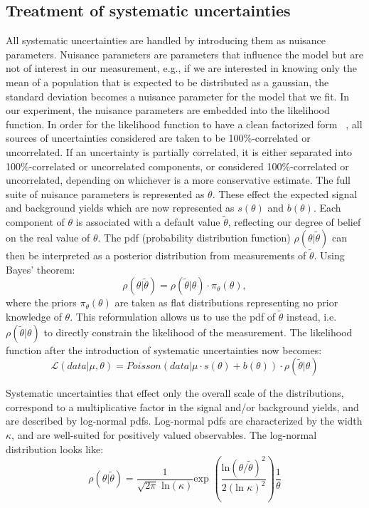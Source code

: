 \subsection{Treatment of systematic uncertainties}
\label{sys_treat}
All systematic uncertainties are handled by introducing them as nuisance parameters. Nuisance parameters are parameters that influence the model but are not of interest in our measurement, e.g., if we are interested in knowing only the mean of a population that is expected to be distributed as a gaussian, the standard deviation becomes a nuisance parameter for the model that we fit. In our experiment, the nuisance parameters are embedded into the likelihood function. In order for the likelihood function to have a clean factorized form ~\cite{note2011}, all sources of uncertainties considered are taken to be 100\%-correlated or uncorrelated. If an uncertainty is partially correlated, it is either separated into 100\%-correlated or uncorrelated components, or considered 100\%-correlated or uncorrelated, depending on whichever is a more conservative estimate. The full suite of nuisance parameters is represented as $\theta$. These effect the expected signal and background yields which are now represented as $s(\theta)$ and $b(\theta)$. Each component of $\theta$ is associated with a default value $\tilde{\theta}$, reflecting our degree of belief on the real value of $\theta$. The pdf (probability distribution function) $\rho(\theta|\tilde{\theta})$ can then be interpreted as a posterior distribution from measurements of $\tilde{\theta}$. Using Bayes' theorem:
\begin{equation}
  \rho(\theta|\tilde{\theta})=\rho(\tilde{\theta}|\theta)\cdot\pi_\theta(\theta),
\end{equation}
where the priors $\pi_\theta(\theta)$ are taken as flat distributions representing no prior knowledge of $\theta$. This reformulation allows us to use the pdf of $\tilde{\theta}$ instead, i.e. $\rho(\tilde{\theta}|\theta)$  to directly constrain the likelihood of the measurement. The likelihood function after the introduction of systematic uncertainties now becomes:
\begin{equation}
  \mathcal{L}(data|\mu,\theta)=Poisson(data|\mu\cdot s(\theta) + b(\theta))\cdot\rho(\tilde{\theta}|\theta)
\end{equation}

Systematic uncertainties that effect only the overall scale of the distributions, correspond to a multiplicative factor in the signal and/or background yields, and are described by log-normal pdfs. Log-normal pdfs are characterized by the width $\kappa$, and are well-suited for positively valued observables. The log-normal distribution looks like:
\begin{equation}
\rho(\theta|\tilde{\theta})=\frac{1}{\sqrt{2\pi}\text{ ln}(\kappa)}\text{exp }(\frac{\text{ln}(\theta/\tilde{\theta})^2}{2(\text{ln }\kappa)^2}) \frac{1}{\theta}  
\end{equation}

